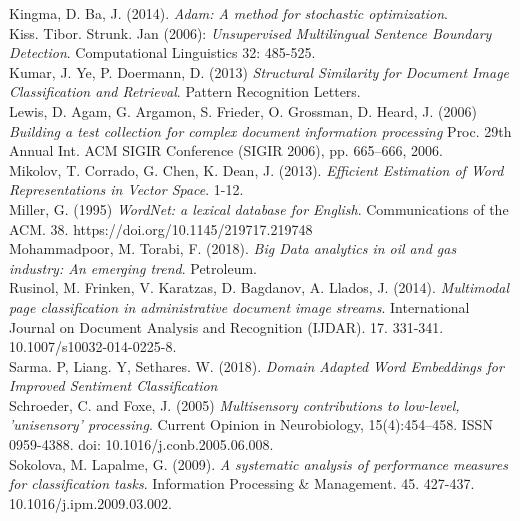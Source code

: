 \documentclass[a4paper,12pt]{article}
\begin{document}
\noindent Kingma, D.  Ba, J. (2014). \emph{Adam: A method for stochastic optimization}.\\

\noindent Kiss. Tibor. Strunk. Jan (2006): \emph{Unsupervised Multilingual Sentence Boundary Detection}. Computational Linguistics 32: 485-525.\\

\noindent Kumar, J. Ye, P. Doermann, D. (2013) \emph{Structural Similarity for Document Image Classification and Retrieval}. Pattern Recognition Letters.\\

\noindent Lewis, D.  Agam, G. Argamon, S. Frieder, O. Grossman, D. Heard, J. (2006) \emph{Building a test collection for complex document information processing} Proc. 29th Annual Int. ACM SIGIR Conference (SIGIR 2006), pp. 665–666, 2006.\\

\noindent Mikolov, T. Corrado, G. Chen, K. Dean, J. (2013).  \emph{Efficient Estimation of Word Representations in Vector Space}. 1-12.\\

\noindent Miller, G. (1995) \emph{WordNet: a lexical database for English}. Communications of the ACM. 38. https://doi.org/10.1145/219717.219748\\

\noindent Mohammadpoor, M. Torabi, F. (2018). \emph{Big Data analytics in oil and gas industry: An emerging trend}. Petroleum.\\

\noindent Rusinol, M. Frinken, V. Karatzas, D. Bagdanov, A. Llados, J. (2014). \emph{Multimodal page classification in administrative document image streams}. International Journal on Document Analysis and Recognition (IJDAR). 17. 331-341. 10.1007/s10032-014-0225-8.\\

\noindent Sarma. P, Liang. Y, Sethares. W. (2018). \emph{Domain Adapted Word Embeddings for Improved Sentiment Classification}\\

\noindent Schroeder, C. and Foxe, J. (2005) \emph{Multisensory contributions to low-level, ’unisensory’ processing}. Current Opinion in Neurobiology, 15(4):454–458. ISSN 0959-4388. doi: 10.1016/j.conb.2005.06.008.\\

\noindent Sokolova, M. Lapalme, G. (2009). \emph{A systematic analysis of performance measures for classification tasks}. Information Processing \& Management. 45. 427-437. 10.1016/j.ipm.2009.03.002. \\
\end{document}
